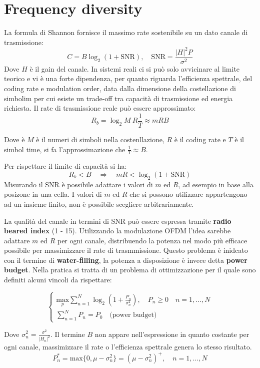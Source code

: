 \section*{Frequency diversity}

La formula di Shannon fornisce il massimo rate sostenibile su un dato canale di trasmissione:
\[
    C = B \log_2 \left( 1 + \text{SNR} \right), \quad \text{SNR} = \frac{\left| H \right|^2 P}{\sigma^2}
\]
Dove $H$ è il gain del canale.
In sistemi reali ci si può solo avvicinare al limite teorico e vi è una forte dipendenza, per quanto riguarda l'efficienza spettrale, del coding rate e modulation order, data dalla dimensione della costellazione di simbolim per cui esiste un trade-off tra capacità di trasmissione ed energia richiesta. Il rate di trasmissione reale può essere approssimato:
\[
    R_b = \log_2 M \  R \frac{1}{T}  \approx m R B
\]

Dove è $M$ è il numeri di simboli nella costenllazione, $R$ è il coding rate e $T$ è il simbol time, si fa l'approssimazione che $\frac{1}{T} \approx B$. 


Per rispettare il limite di capacità si ha:
\[
    R_b < B \quad \Rightarrow \quad mR < \log_2 (1 + \text{SNR})
\] 
Misurando il SNR è possibile adattare i valori di $m$ ed $R$, ad esempio in base alla posizone in una cella.
I valori di $m$ ed $R$ che si possono utilizzare appartengono ad un insieme finito, non è possibile scegliere arbitrariamente.

La qualità del canale in termini di SNR può essere espressa tramite \textbf{radio beared index} (1 - 15).
Utilizzando la modulazione OFDM l'idea sarebbe adattare $m$ ed $R$ per ogni canale, distribuendo la potenza nel modo più efficace possibile per massimizzare il rate di trasmmissione. Questo problema è inidcato con il termine di \textbf{water-filling}, la potenza a disposizione è invece detta \textbf{power budget}. Nella pratica si tratta di un problema di ottimizzazione per il quale sono definiti alcuni vincoli da rispettare:


\[
    \begin{cases}
       \underset{p}{\text{max}} \sum_{n=1}^{N} \log_2(1 + \frac{P_n}{\sigma_n^2}), \quad P_n \geq 0 \quad n = 1, \ldots, N \\
       \sum_{n=1}^{N} P_n = P_0 \quad \text{(power budget)}
    \end{cases}    
\]

Dove $\sigma_n^2 = \frac{\sigma^2}{\left| H_n \right| ^2}$. Il termine $B$ non appare nell'espressione in quanto costante per ogni canale, massimizzare il rate o l'efficienza spettrale genera lo stesso risultato.
\[
    P_n^* = \text{max} \{ 0, \mu - \sigma_n^2    \} = (\mu - \sigma_n^2)^+, \quad n = 1, \ldots, N
\]

